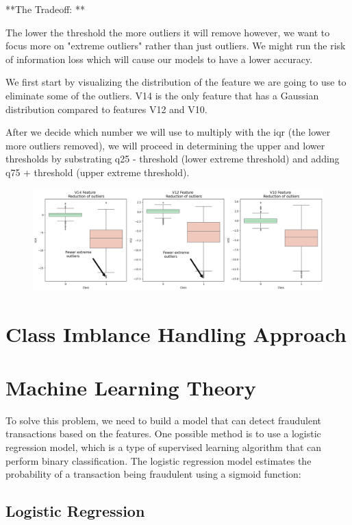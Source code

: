 **The Tradeoff: **

The lower the threshold the more outliers it will remove however, we want to focus more on "extreme outliers" rather than just outliers. We might run the risk of information loss which will cause our models to have a lower accuracy. 

 We first start by visualizing the distribution of the feature we are going to use to eliminate some of the outliers. V14 is the only feature that has a Gaussian distribution compared to features V12 and V10.
 
 After we decide which number we will use to multiply with the iqr (the lower more outliers removed), we will proceed in determining the upper and lower thresholds by substrating q25 - threshold (lower extreme threshold) and adding q75 + threshold (upper extreme threshold).

\begin{figure}[h]
	\centering
	\includegraphics[width=0.7\linewidth]{../output10}
	\caption{}
	\label{Visualization of Outliers}
\end{figure}


\section{Class Imblance Handling Approach}


\section{Machine Learning Theory}

To solve this problem, we need to build a model that can detect fraudulent transactions based on the features. One possible method is to use a logistic regression model, which is a type of supervised learning algorithm that can perform binary classification. The logistic regression model estimates the probability of a transaction being fraudulent using a sigmoid function:

\subsection{Logistic Regression}



